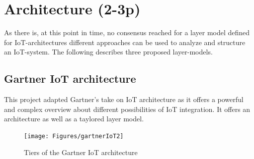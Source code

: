 \section{Architecture (2-3p)}

As there is, at this point in time, no consensus reached for a layer model defined for IoT-architectures \parencite{noModel}
different approaches can be used to analyze and structure an IoT-system. 
The following describes three proposed layer-models.

\subsection{Gartner IoT architecture}

This project adapted Gartner's take on IoT architecture as it offers a powerful and complex overview about different 
possibilities of IoT integration. 
It offers an architecture as well as a taylored layer model.

\begin{figure}[th]
	\centering
	\texttt{[image: Figures/gartnerIoT2]}
	\decoRule
	\caption[Gartner]{Tiers of the Gartner IoT architecture}
	\label{fig:gartnerIoT2}
\end{figure}

